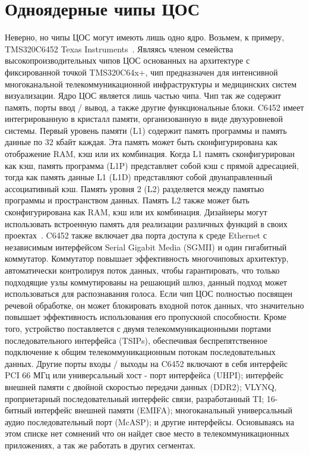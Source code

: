 \section{Одноядерные чипы ЦОС}

Неверно, но чипы ЦОС могут имеють лишь одно ядро. Возьмем, к примеру, TMS320C6452 Texas Instruments~\cite{building_simple}. Являясь членом семейства высокопроизводительных чипов ЦОС основанных на архитектуре с фиксированной точкой TMS320C64x+, чип предназначен для интенсивной многоканальной телекоммуникационной инфраструктуры и медицинских систем визуализации. Ядро ЦОС является лишь частью чипа. Чип так же содержит память, порты ввод / вывод, а также другие функциональные блоки. 
C6452 имеет интегрированную в кристалл памяти, организованную в виде двухуровневой системы. Первый уровень памяти (L1) содержит память программы и память данные по 32 кбайт каждая. Эта память может быть сконфигурирована как отображение RAM, кэш или их комбинация. 
Когда L1 память сконфигурирован как кэш, память программа (L1P) представляет собой кэш с прямой адресацией, тогда как память данные L1 (L1D) представляют собой двунаправленный ассоциативный кэш. Память уровня 2 (L2) разделяется между памятью программы и пространством данных. Память L2 также может быть сконфигурирована как RAM, кэш или их комбинация. Дизайнеры могут использовать встроенную память для реализации различных функций в своих проектах~\cite{powering_today}. 
C6452 также включает два порта доступа к среде Ethernet с независимым интерфейсом Serial Gigabit Media (SGMII) и один гигабитный коммутатор. Коммутатор повышает эффективность многочиповых архитектур, автоматически контролируя поток данных, чтобы гарантировать, что только подходящие узлы коммутированы на решающий шлюз, данный подход может использоваться для распознавания голоса. Если чип ЦОС полностью посвящен речевой обработке, он может блокировать входной поток данных, что значительно повышает эффективность использования его пропускной способности. Кроме того, устройство поставляется с двумя телекоммуникационными портами последовательного интерфейса (TSIPs), обеспечивая беспрепятственное подключение к общим телекоммуникационным потокам последовательных данных. 
Другие порты входы / выходы на C6452 включают в себя интерфейс PCI 66 МГц или универсальный хост - порт интерфейса (UHPI); интерфейс внешней памяти с двойной скоростью передачи данных (DDR2); VLYNQ, проприетарный последовательный интерфейс связи, разработанный TI; 16-битный интерфейс внешней памяти (EMIFA); многоканальный универсальный аудио последовательный порт (McASP); и другие интерфейсы. Основываясь на этом списке нет сомнений что он найдет свое место в телекоммуникационных приложениях, а так же работать в других сегментах. 
